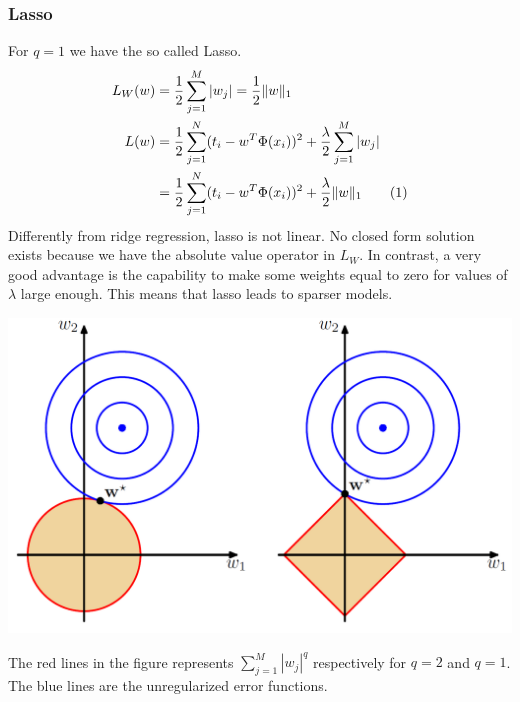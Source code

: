 \documentclass[main.tex]{subfiles}
\newcommand\numberthis{\addtocounter{equation}{1}\tag{\theequation}}
\begin{document}
\subsubsection{Lasso}
For $q=1$ we have the so called Lasso.
\begin{align*}
    L_W(w) &= \frac{1}{2}\sum_{j=1}^M |w_j| = \frac{1}{2}\| w \|_1 \\
    L(w) &= \frac{1}{2}\sum_{j=1}^N(t_i-w^T\Phi(x_i))^2 + \frac{\lambda}{2}\sum_{j=1}^M |w_j| \\
    &= \frac{1}{2}\sum_{j=1}^N(t_i-w^T\Phi(x_i))^2 + \frac{\lambda}{2}\| w \|_1 \numberthis
\end{align*}
Differently from ridge regression, lasso is not linear. No closed form solution exists because we have the absolute value operator in $L_W$. In contrast, a very good advantage is the capability to make some weights equal to zero for values of $\lambda$ large enough. This means that lasso leads to sparser models\footnotemark.
\begin{center}
    \includegraphics[scale=0.4]{img/Parameter_space_regularization.PNG}
\end{center}
The red lines in the figure represents $\sum_{j=1}^M |w_j|^q$ respectively for $q=2$ and $q=1$.
The blue lines are the unregularized error functions.
\newpage
\end{document}
